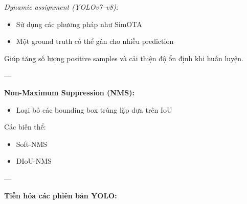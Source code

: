 \textit{Dynamic assignment (YOLOv7–v8):}
\begin{itemize}
\item Sử dụng các phương pháp như SimOTA
\item Một ground truth có thể gán cho nhiều prediction
\end{itemize}

Giúp tăng số lượng positive samples và cải thiện độ ổn định khi huấn luyện.

---

\textbf{Non-Maximum Suppression (NMS):}

\begin{itemize}
\item Loại bỏ các bounding box trùng lặp dựa trên IoU
\end{itemize}

Các biến thể:
\begin{itemize}
\item Soft-NMS
\item DIoU-NMS
\end{itemize}

---

\textbf{Tiến hóa các phiên bản YOLO:}

